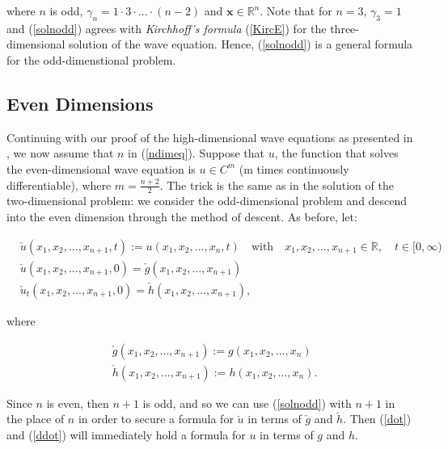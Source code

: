 \documentclass[a4paper, 12pt]{article}
\numberwithin{equation}{section}
\begin{document}
where $n$ is odd, $\gamma_n=1 \cdot 3 \cdot ... \cdot (n-2)$ and
$\boldsymbol{x}\in \mathbb{R}^n$. Note that for $n=3$, $\gamma_3 = 1$ and
(\ref{solnodd}) agrees with \emph{Kirchhoff's formula} (\ref{KircE}) for the
three-dimensional solution of the wave equation. Hence, (\ref{solnodd}) is a
general formula for the odd-dimenstional problem.

\subsection{Even Dimensions}
Continuing with our proof of the high-dimensional wave equations as presented in
\cite{Ev}, we now assume that $n$ in (\ref{ndimeq}). Suppose that $u$, the
function that solves the even-dimensional wave equation is $u \in C^m$ (m times
continuously differentiable), where $m=\frac{n+2}{2}$. The trick is the same as
in the solution of the two-dimensional problem: we consider the odd-dimensional
problem and descend into the even dimension through the method of descent. As
before, let:

\begin{equation} \label{dot}
    \begin{aligned}
        &\check{u}(x_1, x_2, ..., x_{n+1}, t):=u(x_1, x_2, ..., x_n, t) \quad \textrm{with} \quad x_1, x_2, ..., x_{n+1} \in \mathbb{R}, \quad t \in [0, \infty)\\
        &\check{u}(x_1, x_2, ..., x_{n+1}, 0)=\check{g}(x_1, x_2, ..., x_{n+1})\\
        &\check{u}_t(x_1, x_2, ..., x_{n+1}, 0)=\check{h}(x_1, x_2, ..., x_{n+1}),
    \end{aligned}
\end{equation}

where 

\begin{equation} \label{ddot}
    \begin{aligned}
        &\check{g}(x_1, x_2, ..., x_{n+1}):=g(x_1, x_2, ..., x_n)\\
        &\check{h}(x_1, x_2, ..., x_{n+1}):=h(x_1, x_2, ..., x_n).
    \end{aligned}
\end{equation}

Since $n$ is even, then $n+1$ is odd, and so we can use (\ref{solnodd}) with
$n+1$ in the place of $n$ in order to secure a formula for $\check{u}$ in terms
of $\check{g}$ and $\check{h}$. Then (\ref{dot}) and (\ref{ddot}) will
immediately hold a formula for $u$ in terms of $g$ and $h$. \\
\end{document}
